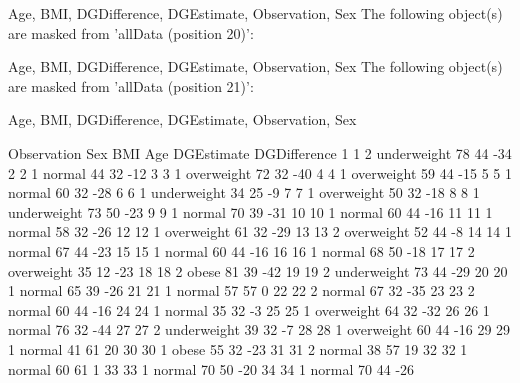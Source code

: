 \begin{Schunk}
\begin{Soutput}
		Age, BMI, DGDifference, DGEstimate, Observation, Sex
		The following object(s) are masked from 'allData (position 20)':

		Age, BMI, DGDifference, DGEstimate, Observation, Sex
		The following object(s) are masked from 'allData (position 21)':

		Age, BMI, DGDifference, DGEstimate, Observation, Sex
	\end{Soutput}
	\begin{Soutput}
		Observation Sex         BMI Age DGEstimate DGDifference
		1             1   2 underweight  78         44          -34
		2             2   1      normal  44         32          -12
		3             3   1  overweight  72         32          -40
		4             4   1  overweight  59         44          -15
		5             5   1      normal  60         32          -28
		6             6   1 underweight  34         25           -9
		7             7   1  overweight  50         32          -18
		8             8   1 underweight  73         50          -23
		9             9   1      normal  70         39          -31
		10           10   1      normal  60         44          -16
		11           11   1      normal  58         32          -26
		12           12   1  overweight  61         32          -29
		13           13   2  overweight  52         44           -8
		14           14   1      normal  67         44          -23
		15           15   1      normal  60         44          -16
		16           16   1      normal  68         50          -18
		17           17   2  overweight  35         12          -23
		18           18   2       obese  81         39          -42
		19           19   2 underweight  73         44          -29
		20           20   1      normal  65         39          -26
		21           21   1      normal  57         57            0
		22           22   2      normal  67         32          -35
		23           23   2      normal  60         44          -16
		24           24   1      normal  35         32           -3
		25           25   1  overweight  64         32          -32
		26           26   1      normal  76         32          -44
		27           27   2 underweight  39         32           -7
		28           28   1  overweight  60         44          -16
		29           29   1      normal  41         61           20
		30           30   1       obese  55         32          -23
		31           31   2      normal  38         57           19
		32           32   1      normal  60         61            1
		33           33   1      normal  70         50          -20
		34           34   1      normal  70         44          -26

\end{Soutput}
\end{Schunk}

